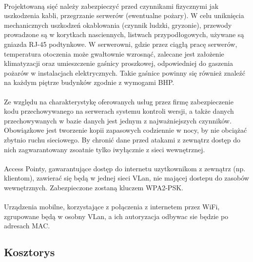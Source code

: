 \paragraph{}
Projektowaną sięć należy zabezpieczyć przed czynnikami fizycznymi jak uszkodzenia kabli, przegrzanie serwerów (ewentualne pożary). W celu uniknięcia mechanicznych uszkodzeń okablowania (czynnik ludzki, gryzonie), przewody prowadzone są w korytkach nasciennych, listwach przypodłogowych, używane są gniazda RJ-45 podtynkowe. W serwerowni, gdzie przez ciągłą pracę serwerów, temperatura otoczenia może gwałtownie wzrosnąć, zalecane jest założenie klimatyzacji oraz umieszczenie gaśnicy proszkowej, odpowiedniej do gaszenia pożarów w instalacjach elektrycznych. Takie gaśnice powinny się również znaleźć na każdym piętrze budynków zgodnie z wymogami BHP.

\paragraph{}
Ze względu na charakterystykę oferowanych usług przez firmę zabezpieczenie kodu przechowywanego na serwerach systemu kontroli wersji, a także danych przechowywanych w bazie danych jest jednym z najważniejszych czynników. Obowiązkowe jest tworzenie kopii zapasowych codziennie w nocy, by nie obciążać zbytnio ruchu sieciowego. By chronić dane przed atakami z zewnątrz dostęp do nich zagwarantowany zsoatnie tylko iwyłącznie z sieci wewnętrznej.

\paragraph{}
Access Pointy, gawarantujące dostęp do internetu uzytkownikom z zewnątrz (np. klientom), zawierać się będą w jednej sieci VLan, nie mającej dostepu do zasobów wewnętrznych. Zabezpieczone zostaną kluczem WPA2-PSK.

\paragraph{}
Urządzenia mobilne, korzystające z połączenia z internetem przez WiFi, zgrupowane będą w osobny VLan, a ich autoryzacja odbywac sie będzie po adresach MAC.

\subsection{Kosztorys}
\paragraph{}

